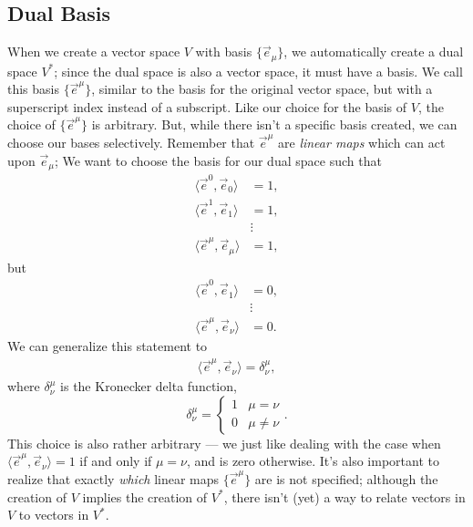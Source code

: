 \subsection{Dual Basis}
When we create a vector space $V$ with basis $\{\vec{e}_\mu\}$, we automatically create a dual space $V^*$; since the dual space is also a vector space, it must have a basis. We call this basis $\{\vec{e}^\mu\}$, similar to the basis for the original vector space, but with a superscript index instead of a subscript.
Like our choice for the basis of $V$, the choice of $\{\vec{e}^\mu\}$ is arbitrary.
But, while there isn't a specific basis created, we can choose our bases selectively.
Remember that $\vec{e}^\mu$ are \emph{linear maps} which can act upon $\vec{e}_\mu$;
We want to choose the basis for our dual space such that
\begin{align*}
    \langle \vec{e}^0, \vec{e}_0 \rangle &= 1, \\
    \langle \vec{e}^1, \vec{e}_1 \rangle &= 1, \\
    &\vdots \\
    \langle \vec{e}^\mu, \vec{e}_\mu \rangle &= 1,
\end{align*}
but 
\begin{align*}
    \langle \vec{e}^0, \vec{e}_1 \rangle &= 0, \\
    &\vdots \\
    \langle \vec{e}^\mu, \vec{e}_\nu \rangle &= 0.
\end{align*}
We can generalize this statement to
\begin{align*}
    \langle \vec{e}^\mu, \vec{e}_\nu \rangle = \delta^\mu_\nu,
\end{align*}
where $\delta^\mu_\nu$ is the Kronecker delta function,
\[
    \delta^\mu_\nu =
    \begin{cases}
        1 & \mu = \nu \\
        0 & \mu \not= \nu
    \end{cases}.
\]
This choice is also rather arbitrary --- we just like dealing with the case when $\langle \vec{e}^\mu, \vec{e}_\nu \rangle = 1$ if and only if $\mu = \nu$, and is zero otherwise. It's also important to realize that exactly \emph{which} linear maps $\{\vec{e}^\mu\}$ are is not specified; although the creation of $V$ implies the creation of $V^*$, there isn't (yet) a way to relate vectors in $V$ to vectors in $V^*$.


